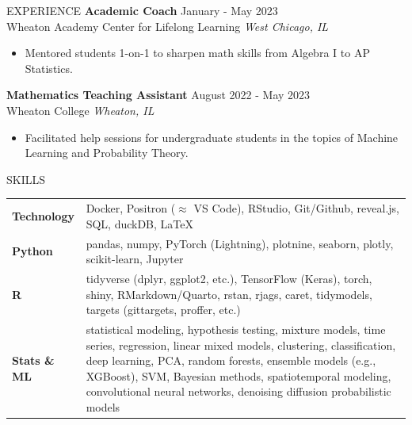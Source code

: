 \documentclass{resume} %
\begin{document}
\begin{rSection}{EXPERIENCE}
\textbf{Academic Coach} \hfill January - May 2023\\
Wheaton Academy Center for Lifelong Learning \hfill \textit{West Chicago, IL}
 \begin{itemize}
    \itemsep -3pt {}
     \item Mentored students 1-on-1 to sharpen math skills from Algebra I to AP Statistics.
 \end{itemize}

\textbf{Mathematics Teaching Assistant} \hfill August 2022 - May 2023\\
Wheaton College \hfill \textit{Wheaton, IL}
 \begin{itemize}
    \itemsep -3pt {}
     \item Facilitated help sessions for undergraduate students in the topics of Machine Learning and Probability Theory.
 \end{itemize}

\end{rSection}

\begin{rSection}{SKILLS}

\begin{tabular}{ @{} >{\bfseries}l @{\hspace{6ex}} l }
Technology & Docker, Positron ($\approx$ VS Code), RStudio, Git/Github, reveal.js, SQL, duckDB, \LaTeX \\
Python & pandas, numpy, PyTorch (Lightning), plotnine, seaborn, plotly, scikit-learn, Jupyter \\
\textsf{R} & \parbox[t]{0.85\textwidth}{tidyverse (dplyr, ggplot2, etc.), TensorFlow (Keras), torch, shiny, RMarkdown/Quarto, rstan, rjags, caret, tidymodels, targets (gittargets, proffer, etc.)} \\
Stats \& ML & \parbox[t]{0.85\textwidth}{statistical modeling, hypothesis testing, mixture models, time series, regression, linear mixed models, clustering, classification, deep learning, PCA, random forests, ensemble models (e.g., XGBoost), SVM, Bayesian methods, spatiotemporal modeling, convolutional neural networks, denoising diffusion probabilistic models} \\
\end{tabular}\\
\end{rSection}
\end{document}
